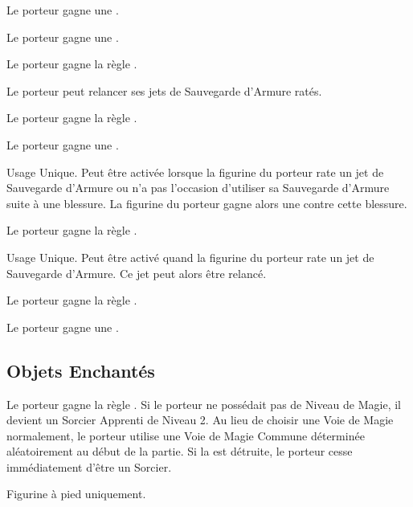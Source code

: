 \startpricelist

Le porteur gagne une .

Le porteur gagne une .

Le porteur gagne la règle .

Le porteur peut relancer ses jets de Sauvegarde d'Armure ratés.

Le porteur gagne la règle .

Le porteur gagne une .

Usage Unique. Peut être activée lorsque la figurine du porteur rate un jet de Sauvegarde d'Armure ou n'a pas l'occasion d'utiliser sa Sauvegarde d'Armure suite à une blessure. La figurine du porteur gagne alors une  contre cette blessure.

Le porteur gagne la règle .

Usage Unique. Peut être activé quand la figurine du porteur rate un jet de Sauvegarde d'Armure. Ce jet peut alors être relancé.

Le porteur gagne la règle \fireborn{}.

Le porteur gagne une .

\endpricelist

\newpage
\hypertarget{enchanteditems}{\subsection{Objets Enchantés}}
\label{enchanted_items}

\startpricelist

Le porteur gagne la règle \stupidity{}. Si le porteur ne possédait pas de Niveau de Magie, il devient un Sorcier Apprenti de Niveau 2. Au lieu de choisir une Voie de Magie normalement, le porteur utilise une Voie de Magie Commune déterminée aléatoirement au début de la partie. Si la \wizardshood{} est détruite, le porteur cesse immédiatement d'être un Sorcier.

Figurine à pied uniquement.

